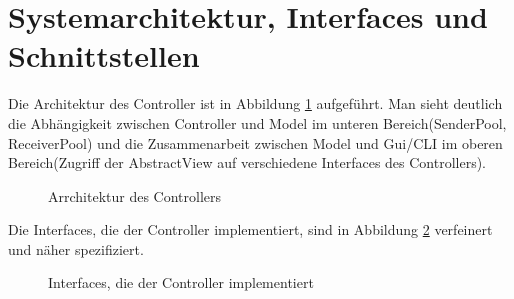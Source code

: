 \section{Systemarchitektur, Interfaces und Schnittstellen}

  Die Architektur des Controller ist in Abbildung \ref{img:sysarch} aufgeführt. Man sieht deutlich die Abhängigkeit zwischen Controller und Model im unteren Bereich(SenderPool, ReceiverPool)
  und die Zusammenarbeit zwischen Model und Gui/CLI im oberen Bereich(Zugriff der AbstractView auf verschiedene Interfaces des Controllers).
  \begin{figure}[H]
      \centering
      \caption{Arrchitektur des Controllers}
      \label{img:sysarch}
  \end{figure}
  Die Interfaces, die der Controller implementiert, sind in Abbildung \ref{img:inter} verfeinert und näher spezifiziert.
  \begin{figure}[H]
      \centering
      \caption{Interfaces, die der Controller implementiert}
      \label{img:inter}
  \end{figure}
